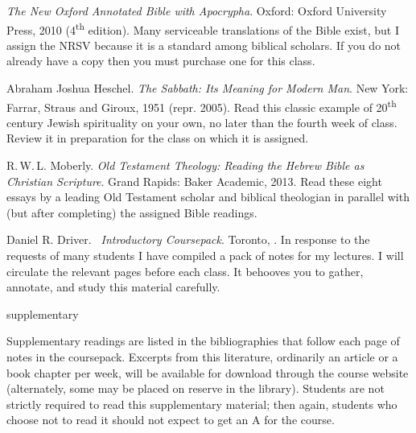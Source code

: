 \documentclass[titlepage]{article}
\begin{document}
\begingroup
\renewcommand{\section}[2]{}%
\begin{thebibliography}{Heschel}%

	 \emph{The New Oxford Annotated Bible with
	Apocrypha}. Oxford: Oxford University Press, 2010
	(4\textsuperscript{th} edition). Many serviceable translations of
	the Bible exist, but I assign the NRSV because it is a standard
	among biblical scholars. If you do not already have a copy then you
	must purchase one for this class.

	 Abraham Joshua Heschel. \emph{The
	Sabbath: Its Meaning for Modern Man}. New York: Farrar, Straus and
	Giroux, 1951 (repr. 2005). Read this classic example of
	20\textsuperscript{th} century Jewish spirituality on your own, no
	later than the fourth week of class. Review it in preparation for
	the class on which it is assigned.

	 R.\,W.\,L. Moberly. \emph{Old Testament
	Theology: Reading the Hebrew Bible as Christian Scripture}. Grand
	Rapids: Baker Academic, 2013. Read these eight essays by a leading
	Old Testament scholar and biblical theologian in parallel with (but
	after completing) the assigned Bible readings.

	 Daniel R. Driver. \emph{\ctitle\ Introductory
	Coursepack}. Toronto, \csemester. In response to the requests of
	many students I have compiled a pack of notes for my lectures. I
	will circulate the relevant pages before each class. It behooves you
	to gather, annotate, and study this material carefully.

\end{thebibliography}
\endgroup

\section{Supplementary Texts}
\label{supplementary}

Supplementary readings are listed in the bibliographies that follow each
page of notes in the coursepack. Excerpts from this literature,
ordinarily an article or a book chapter per week, will be available for
download through the course website (alternately, some may be placed on
reserve in the library). Students are not strictly required to read this
supplementary material; then again, students who choose not to read it
should not expect to get an A for the course.
\end{document}

